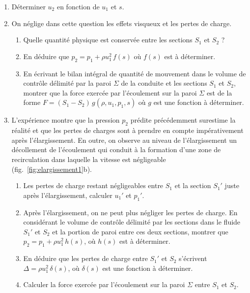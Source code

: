 \begin{enumerate}
\item
  D\'eterminer $u_2$ en fonction de $u_1$ et $s$.
\item
  On n\'eglige dans cette question les effets visqueux et les pertes de charge.
  \begin{enumerate}
  \item
    Quelle quantit\'e physique est conserv\'ee entre les sections $S_1$ et $S_2$ ?
  \item
    En d\'eduire que $p_2 = p_1 + \rho u_1^2 \, f(s)$ o\`u $f(s)$ est à d\'eterminer.
  \item
    En \'ecrivant le bilan int\'egral de quantit\'e de mouvement dans le volume de contrôle
    d\'elimit\'e par la paroi $\Sigma$ de la conduite et les sections $S_1$ et $S_2$,
    montrer que la force exerc\'ee par l'\'ecoulement sur la paroi $\Sigma$ est de la forme
    $F = (S_1 - S_2) \, g(\rho, u_1, p_1, s)$ o\`u $g$ est une fonction à d\'eterminer. 
  \end{enumerate}
\item
  L'exp\'erience montre que la pression $p_2$ pr\'edite pr\'ec\'edemment surestime la r\'ealit\'e
  et que les pertes de charges sont à prendre en compte imp\'erativement après l'\'elargissement.
  En outre, on observe au niveau de l'\'elargissement un d\'ecollement de l'\'ecoulement qui conduit 
  à la formation d'une zone de recirculation dans laquelle la vitesse est n\'egligeable
  (fig.~\ref{fig:elargissement1}b).
  \begin{enumerate}
  \item
    Les pertes de charge restant n\'egligeables entre $S_1$ et la section $S_1'$
    juste après l'\'elargis\-sement, calculer $u_1'$ et $p_1'$.
  \item
    Après l'\'elargissement, on ne peut plus n\'egliger les pertes de charge.
    En consid\'erant le volume de contrôle d\'elimit\'e par les sections dans le fluide $S_1'$
    et $S_2$ et la portion de paroi entre ces deux sections, montrer que 
    $p_2 = p_1 +  \rho u_1^2 \, h(s)$, o\`u $h(s)$ est à d\'eterminer.
  \item
    En d\'eduire que les pertes de charge entre $S_1'$ et $S_2$ s'\'ecrivent
    $\Delta = \rho u_1^2 \,\delta(s)$, o\`u $\delta(s)$ est une fonction à d\'eterminer.
  \item
    Calculer la force exerc\'ee par l'\'ecoulement sur la paroi $\Sigma$ entre $S_1$ et $S_2$.
  \end{enumerate}
\end{enumerate}




